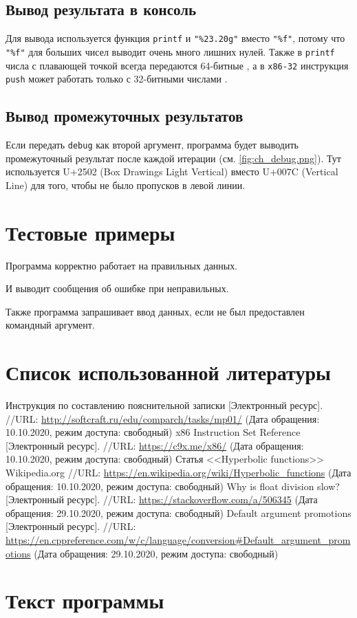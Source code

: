 \documentclass[a4paper]{article}
\begin{document}
  \subsection{Вывод результата в консоль}
  Для вывода используется функция \texttt{printf} и \texttt{"\%23.20g"} вместо \texttt{"\%f"},
  потому что \texttt{"\%f"} для больших чисел выводит очень много лишних нулей.
  Также в \texttt{printf} числа с плавающей точкой всегда передаются 64-битные \cite{promo},
  а в \texttt{x86-32} инструкция \texttt{push} может работать только с 32-битными числами \cite{x86}.

  \subsection{Вывод промежуточных результатов}
  Если передать \texttt{debug} как второй аргумент, программа будет выводить промежуточный результат после каждой итерации
  (см. \autoref{fig:ch_debug.png}).
  Тут используется U+2502 (Box Drawings Light Vertical) вместо U+007C (Vertical Line) для того, чтобы не было пропусков в левой линии.

  \newpage
  \section{Тестовые примеры}
  Программа корректно работает на правильных данных. 

  И выводит сообщения об ошибке при неправильных. 

  Также программа запрашивает ввод данных, если не был предоставлен командный аргумент. 

  \newpage
  \section{Список использованной литературы}
  \begin{thebibliography}{3}
     Инструкция по составлению пояснительной записки [Электронный ресурс].
      //URL: \url{http://softcraft.ru/edu/comparch/tasks/mp01/} (Дата обращения: 10.10.2020, режим доступа: свободный)
     x86 Instruction Set Reference [Электронный ресурс].
      //URL: \url{https://c9x.me/x86/} (Дата обращения: 10.10.2020, режим доступа: свободный)
     Статья <<Hyperbolic functions>> Wikipedia.org
      //URL: \url{https://en.wikipedia.org/wiki/Hyperbolic_functions} (Дата обращения: 10.10.2020, режим доступа: свободный)
     Why is float division slow? [Электронный ресурс].
      //URL: \url{https://stackoverflow.com/a/506345} (Дата обращения: 29.10.2020, режим доступа: свободный)
     Default argument promotions [Электронный ресурс].
      //URL: \url{https://en.cppreference.com/w/c/language/conversion#Default_argument_promotions} (Дата обращения: 29.10.2020, режим доступа: свободный)
  \end{thebibliography}

  \newpage
  \section{Текст программы}
  
\end{document}
